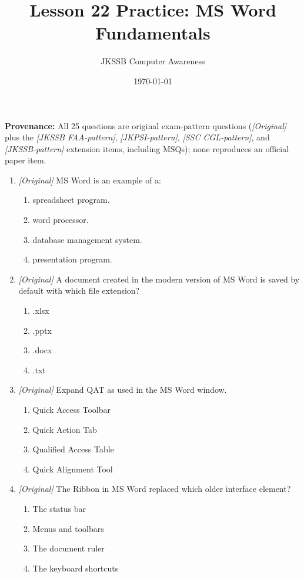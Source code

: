 \documentclass[11pt]{article}
\title{Lesson 22 Practice: MS Word Fundamentals}
\author{JKSSB Computer Awareness}
\date{\today}
\begin{document}
\maketitle
\noindent\textbf{Provenance:} All 25 questions are original exam-pattern questions (\textit{[Original]} plus the \textit{[JKSSB FAA-pattern]}, \textit{[JKPSI-pattern]}, \textit{[SSC CGL-pattern]}, and \textit{[JKSSB-pattern]} extension items, including MSQs); none reproduces an official paper item.

\begin{enumerate}[label=\textbf{Q\arabic*.}, leftmargin=*]
\item \textit{[Original]} MS Word is an example of a:
  \begin{enumerate}[label=\Alph*.]
    \item spreadsheet program.
    \item word processor.
    \item database management system.
    \item presentation program.
  \end{enumerate}
\item \textit{[Original]} A document created in the modern version of MS Word
  is saved by default with which file extension?
  \begin{enumerate}[label=\Alph*.]
    \item .xlsx
    \item .pptx
    \item .docx
    \item .txt
  \end{enumerate}
\item \textit{[Original]} Expand QAT as used in the MS Word window.
  \begin{enumerate}[label=\Alph*.]
    \item Quick Access Toolbar
    \item Quick Action Tab
    \item Qualified Access Table
    \item Quick Alignment Tool
  \end{enumerate}
\item \textit{[Original]} The Ribbon in MS Word replaced which older
  interface element?
  \begin{enumerate}[label=\Alph*.]
    \item The status bar
    \item Menus and toolbars
    \item The document ruler
    \item The keyboard shortcuts

\end{enumerate}
\end{enumerate}
\end{document}

